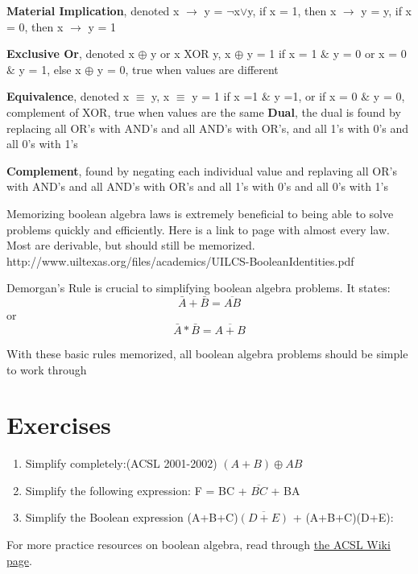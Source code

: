 \documentclass{pset_template}
\begin{document}
\textbf{Material Implication}, denoted  x $\rightarrow$ y = $\neg$x$\lor$y, if x = 1, then x $\rightarrow$ y = y, if x = 0, then x $\rightarrow$ y = 1

\noindent
\textbf{Exclusive Or}, denoted x $\oplus$ y or x XOR y, x $\oplus$ y = 1 if x = 1 $\&$ y = 0 or x = 0 $\&$ y = 1, else x $\oplus$ y = 0, true when values are different

\noindent
\textbf{Equivalence}, denoted x $\equiv$ y, x $\equiv$ y = 1 if x =1 $\&$ y =1, or if x = 0 $\&$ y = 0, complement of XOR, true when values are the same
\noindent
\textbf{Dual}, the dual is found by replacing all OR's with AND's and all AND's with OR's, and all 1's with 0's and all 0's with 1's

\noindent
\textbf{Complement}, found by negating each individual value and replaving all OR's with AND's and all AND's with OR's and all 1's with 0's and all 0's with 1's
\bigskip

\noindent
Memorizing boolean algebra laws is extremely beneficial to being able to solve problems quickly and efficiently. Here is a link to page with almost every law. Most are derivable, but should still be memorized.  http://www.uiltexas.org/files/academics/UILCS-BooleanIdentities.pdf

Demorgan's Rule is crucial to simplifying boolean algebra problems. It states: $$ \bar{A} + \bar{B} = \overline{AB}$$ or $$ \bar{A} * \bar{B} = \overline{A+B}$$

\bigskip

\noindent
With these basic rules memorized, all boolean algebra problems should be simple to work through

\section{Exercises}
\begin{enumerate}
\item Simplify completely:(ACSL 2001-2002)
$( A + B )\oplus A B$

\item Simplify the following expression: F = BC + $\overline{BC}$ + BA

\item Simplify the Boolean expression (A+B+C)$\overline{(D+E)}$ + (A+B+C)(D+E):
\end{enumerate}

For more practice resources on boolean algebra, read through
\href{http://www.categories.acsl.org/wiki/index.php?title=Boolean_Algebra}{the ACSL Wiki page}.
\end{document}
